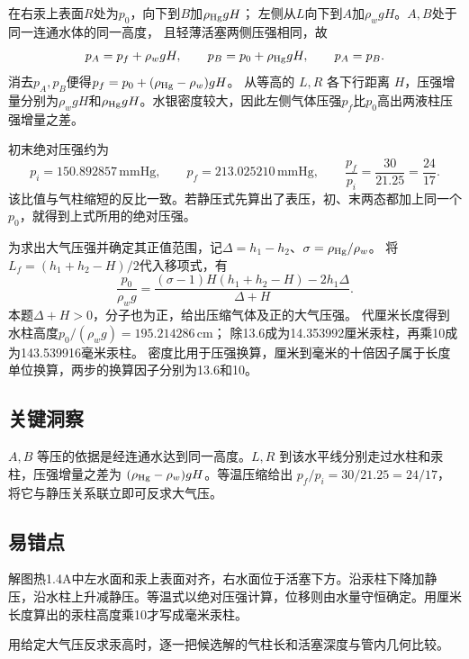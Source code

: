 \documentclass[UTF8,fontset=fandol,a4paper,11pt]{ctexart}
\begin{document}
在右汞上表面$R$处为$p_0$，向下到$B$加$\rho_{\rm Hg}gH$；
左侧从$L$向下到$A$加$\rho_wgH$。$A,B$处于同一连通水体的同一高度，
且轻薄活塞两侧压强相同，故
\[
p_A=p_f+\rho_wgH,\qquad
p_B=p_0+\rho_{\rm Hg}gH,\qquad p_A=p_B.
\]
消去$p_A,p_B$便得$p_f=p_0+(\rho_{\rm Hg}-\rho_w)gH$。
从等高的 $L,R$ 各下行距离 $H$，压强增量分别为$\rho_wgH$和$\rho_{\rm Hg}gH$。水银密度较大，因此左侧气体压强$p_f$比$p_0$高出两液柱压强增量之差。

初末绝对压强约为
\[
p_i=150.892857\,\mathrm{mmHg},\qquad
p_f=213.025210\,\mathrm{mmHg},\qquad
\frac{p_f}{p_i}=\frac{30}{21.25}=\frac{24}{17}.
\]
该比值与气柱缩短的反比一致。若静压式先算出了表压，初、末两态都加上同一个 $p_0$，就得到上式所用的绝对压强。

为求出大气压强并确定其正值范围，记$\Delta=h_1-h_2$、$\sigma=\rho_{\rm Hg}/\rho_w$。
将$L_f=(h_1+h_2-H)/2$代入移项式，有
\[
\frac{p_0}{\rho_wg}
=\frac{(\sigma-1)H(h_1+h_2-H)-2h_1\Delta}{\Delta+H}.
\]
本题$\Delta+H>0$，分子也为正，给出压缩气体及正的大气压强。
代厘米长度得到水柱高度$p_0/(\rho_wg)=195.214286\,\mathrm{cm}$；
除13.6成为14.353992厘米汞柱，再乘10成为143.539916毫米汞柱。
密度比用于压强换算，厘米到毫米的十倍因子属于长度单位换算，两步的换算因子分别为13.6和10。




\subsection*{关键洞察}

$A,B$ 等压的依据是经连通水达到同一高度。$L,R$ 到该水平线分别走过水柱和汞柱，压强增量之差为 $(\rho_{\rm Hg}-\rho_w)gH$。等温压缩给出 $p_f/p_i=30/21.25=24/17$，将它与静压关系联立即可反求大气压。



\subsection*{易错点}

解图热1.4A中左水面和汞上表面对齐，右水面位于活塞下方。沿汞柱下降加静压，沿水柱上升减静压。等温式以绝对压强计算，位移则由水量守恒确定。用厘米长度算出的汞柱高度乘10才写成毫米汞柱。

用给定大气压反求汞高时，逐一把候选解的气柱长和活塞深度与管内几何比较。

\end{document}
